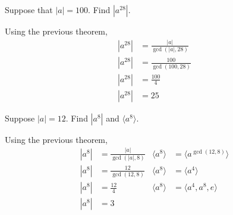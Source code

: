     \begin{example}
        Suppose that \(|a| = 100\). Find \(|a^{28}|\).

        Using the previous theorem,
        \begin{align*}
            |a^{28}| &= \frac{|a|}{\gcd(|a|, 28)} \\
            |a^{28}| &= \frac{100}{\gcd(100, 28)} \\
            |a^{28}| &= \frac{100}{4} \\
            |a^{28}| &= 25
        \end{align*}
    \end{example}

    \begin{example}
        Suppose \(|a| = 12\). Find \(|a^8|\) and \(\langle a^8\rangle\).

        Using the previous theorem, 
        \begin{align*}
            |a^8| &= \frac{|a|}{\gcd(|a|, 8)} & \langle a^8\rangle &= \langle a^{\gcd(12, 8)}\rangle \\ 
            |a^8| &= \frac{12}{\gcd(12, 8)} & \langle a^8\rangle &= \langle a^{4}\rangle \\ 
            |a^8| &= \frac{12}{4} & \langle a^8\rangle &= \langle a^4, a^8, e\rangle \\
            |a^8| &= 3
        \end{align*}
    \end{example}